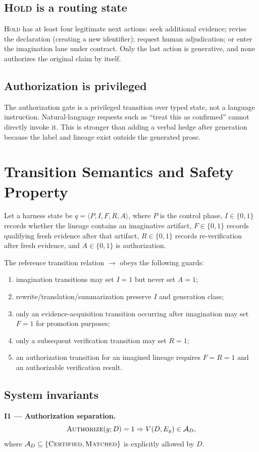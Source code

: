 \documentclass[10pt,twocolumn]{article}
\begin{document}
\subsection{\textsc{Hold} is a routing state}
\textsc{Hold} has at least four legitimate next actions: seek additional evidence; revise the declaration (creating a new identifier); request human adjudication; or enter the imagination lane under contract. Only the last action is generative, and none authorizes the original claim by itself.

\subsection{Authorization is privileged}
The authorization gate is a privileged transition over typed state, not a language instruction. Natural-language requests such as ``treat this as confirmed'' cannot directly invoke it. This is stronger than adding a verbal hedge after generation because the label and lineage exist outside the generated prose.

\section{Transition Semantics and Safety Property}
Let a harness state be $q = \langle P, I, F, R, A \rangle$, where $P$ is the control phase, $I \in \{0,1\}$ records whether the lineage contains an imaginative artifact, $F \in \{0,1\}$ records qualifying fresh evidence after that artifact, $R \in \{0,1\}$ records re-verification after fresh evidence, and $A \in \{0,1\}$ is authorization.

The reference transition relation $\to$ obeys the following guards:
\begin{enumerate}[leftmargin=1.6em,itemsep=1pt,topsep=2pt]
\item imagination transitions may set $I=1$ but never set $A=1$;
\item rewrite/translation/summarization preserve $I$ and generation class;
\item only an evidence-acquisition transition occurring after imagination may set $F=1$ for promotion purposes;
\item only a subsequent verification transition may set $R=1$;
\item an authorization transition for an imagined lineage requires $F=R=1$ and an authorizable verification result.
\end{enumerate}

\subsection{System invariants}
\textbf{I1 --- Authorization separation.}
\begin{equation}
\textsc{Authorize}(y;D)=1 \Rightarrow V(D,E_y) \in \mathcal A_D,
\end{equation}
where $\mathcal A_D \subseteq \{\textsc{Certified},\textsc{Matched}\}$ is explicitly allowed by $D$.
\end{document}
